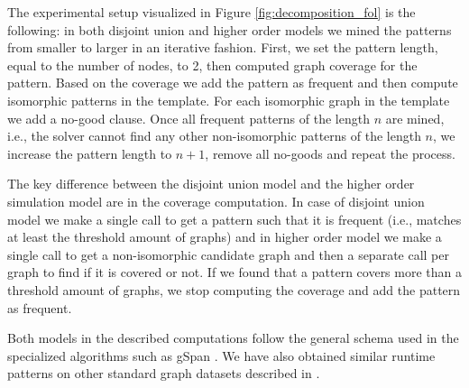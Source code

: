 The experimental setup visualized in Figure \ref{fig:decomposition_fol} is the following: in both disjoint union and higher order models we mined the patterns from smaller to larger in an iterative fashion. First, we set the pattern length, equal to the number of nodes, to 2, then computed graph coverage for the pattern. Based on the coverage we add the pattern as frequent and then compute isomorphic patterns in the template. For each isomorphic graph in the template we add a no-good clause. Once all frequent patterns of the length $n$ are mined, i.e., the solver cannot find any other non-isomorphic patterns of the length $n$, we increase the pattern length to $n+1$, remove all no-goods and repeat the process.

The key difference between the disjoint union model and the higher order simulation model are in the coverage computation. In case of disjoint union model we make a single call to get a pattern such that it is frequent (i.e., matches at least the threshold amount of graphs) and in higher order model we make a single call to get a non-isomorphic candidate graph and then a separate call per graph to find if it is covered or not. If we found that a pattern covers more than a threshold amount of graphs, we stop computing the coverage and add the pattern as frequent.

Both models in the described computations follow the general schema used in the specialized algorithms such as gSpan \cite{gspan}. We have also obtained similar runtime patterns on other standard graph datasets described in \cite{ilp_graph_mining}.
